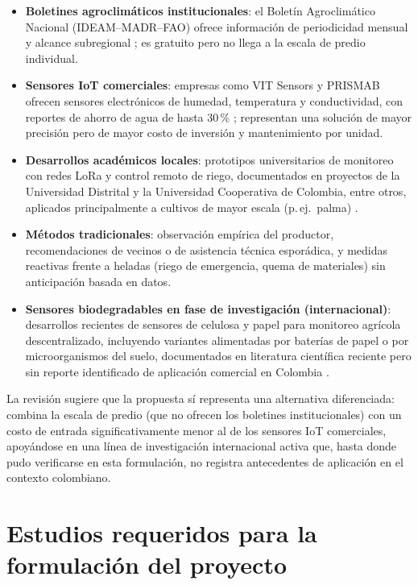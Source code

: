 \documentclass[11pt,a4paper]{article}
\begin{document}
\begin{itemize}
\item \textbf{Boletines agroclimáticos institucionales}: el Boletín Agroclimático Nacional (IDEAM--MADR--FAO) ofrece información de periodicidad mensual y alcance subregional \citep{ideam_ban}; es gratuito pero no llega a la escala de predio individual.
\item \textbf{Sensores IoT comerciales}: empresas como VIT Sensors y PRISMAB ofrecen sensores electrónicos de humedad, temperatura y conductividad, con reportes de ahorro de agua de hasta 30\,\% \citep{vitsensors,prismab}; representan una solución de mayor precisión pero de mayor costo de inversión y mantenimiento por unidad.
\item \textbf{Desarrollos académicos locales}: prototipos universitarios de monitoreo con redes LoRa y control remoto de riego, documentados en proyectos de la Universidad Distrital y la Universidad Cooperativa de Colombia, entre otros, aplicados principalmente a cultivos de mayor escala (p.\,ej.\ palma) \citep{redalyc_iot}.
\item \textbf{Métodos tradicionales}: observación empírica del productor, recomendaciones de vecinos o de asistencia técnica esporádica, y medidas reactivas frente a heladas (riego de emergencia, quema de materiales) sin anticipación basada en datos.
\item \textbf{Sensores biodegradables en fase de investigación (internacional)}: desarrollos recientes de sensores de celulosa y papel para monitoreo agrícola descentralizado, incluyendo variantes alimentadas por baterías de papel o por microorganismos del suelo, documentados en literatura científica reciente pero sin reporte identificado de aplicación comercial en Colombia \citep{nature2026cellulose,ieee2023biodeg,sciencedirect2025paper,sciencedirect2024review,tudelft_sf,osaka_sf,natureworldnews2023}.
\end{itemize}

\noindent La revisión sugiere que la propuesta sí representa una alternativa diferenciada: combina la escala de predio (que no ofrecen los boletines institucionales) con un costo de entrada significativamente menor al de los sensores IoT comerciales, apoyándose en una línea de investigación internacional activa que, hasta donde pudo verificarse en esta formulación, no registra antecedentes de aplicación en el contexto colombiano.

\section{Estudios requeridos para la formulación del proyecto}
\end{document}
